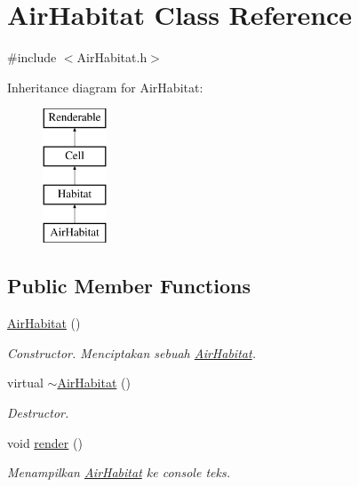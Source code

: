 \hypertarget{classAirHabitat}{\section{Air\+Habitat Class Reference}
\label{classAirHabitat}
}


{\ttfamily \#include $<$Air\+Habitat.\+h$>$}

Inheritance diagram for Air\+Habitat\+:\begin{figure}[H]
\begin{center}
\leavevmode
\includegraphics[height=4.000000cm]{classAirHabitat}
\end{center}
\end{figure}
\subsection*{Public Member Functions}
\begin{DoxyCompactItemize}
\item 
\hypertarget{classAirHabitat_aaf82e1201cb35917975fa58ac5a67763}{\hyperlink{classAirHabitat_aaf82e1201cb35917975fa58ac5a67763}{Air\+Habitat} ()}\label{classAirHabitat_aaf82e1201cb35917975fa58ac5a67763}

\begin{DoxyCompactList}\small\item\em Constructor. Menciptakan sebuah \hyperlink{classAirHabitat}{Air\+Habitat}. \end{DoxyCompactList}\item 
\hypertarget{classAirHabitat_a18f98f33d3edbb7c397e184f3b7ad56b}{virtual \hyperlink{classAirHabitat_a18f98f33d3edbb7c397e184f3b7ad56b}{$\sim$\+Air\+Habitat} ()}\label{classAirHabitat_a18f98f33d3edbb7c397e184f3b7ad56b}

\begin{DoxyCompactList}\small\item\em Destructor. \end{DoxyCompactList}\item 
\hypertarget{classAirHabitat_a27885c3ce4486a50629bf1e53cc34905}{void \hyperlink{classAirHabitat_a27885c3ce4486a50629bf1e53cc34905}{render} ()}\label{classAirHabitat_a27885c3ce4486a50629bf1e53cc34905}

\begin{DoxyCompactList}\small\item\em Menampilkan \hyperlink{classAirHabitat}{Air\+Habitat} ke console teks. \end{DoxyCompactList}\end{DoxyCompactItemize}
